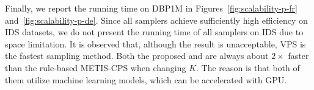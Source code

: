 Finally, we report the running time on DBP1M in Figures~\ref{fig:scalability-p-fr} and~\ref{fig:scalability-p-de}. Since all samplers achieve sufficiently high efficiency on IDS datasets, we do not present the running time of all samplers on IDS due to space limitation. It is observed that, although the result is unacceptable, VPS is the fastest sampling method. Both the proposed \MetisGCN{} and \KMeans{} are always about $2\times$ faster than the rule-based METIS-CPS when changing $K$. The reason is that both of them utilize machine learning models, which can be accelerated with GPU.





